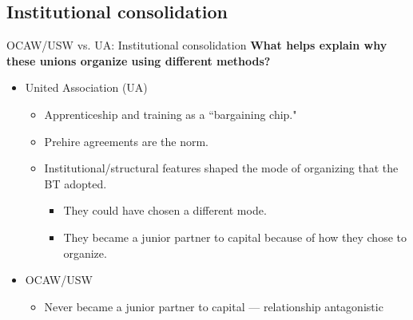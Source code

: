 \documentclass{beamer}
\begin{document}
\subsection{Institutional consolidation}
\begin{frame}{OCAW/USW vs. UA: Institutional consolidation}
\textbf{What helps explain why these unions organize using different methods?}\newline

	\begin{itemize}
		\item United Association (UA)		
			\begin{itemize}
				\item Apprenticeship and training as a ``bargaining chip."
				\item Prehire agreements are the norm.
				\item Institutional/structural features shaped the mode of organizing that the BT adopted.
				\begin{itemize}
					\item They could have chosen a different mode.
					\item They became a junior partner to capital because of how they chose to organize.
				\end{itemize}
	\end{itemize}
		\item OCAW/USW
		\begin{itemize}
			\item Never became a junior partner to capital — relationship antagonistic
		\end{itemize}
	\end{itemize}
\end{frame}
\end{document}
